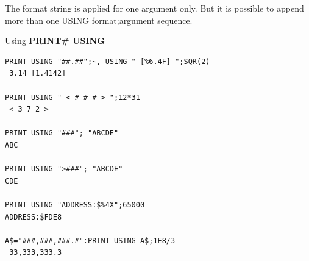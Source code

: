 \begin{description}[leftmargin=2cm,style=nextline]
\item [Remarks:] The format string is applied for one argument only.
                 But it is possible to append more than one
                 USING format;argument sequence.


\newpage
\item [Example:] Using {\bf PRINT\# USING}

\begin{tcolorbox}[colback=black,coltext=white]
\verbatimfont{\codefont}
\begin{verbatim}
PRINT USING "##.##";~, USING " [%6.4F] ";SQR(2)
 3.14 [1.4142]

PRINT USING " < # # # > ";12*31
 < 3 7 2 >

PRINT USING "###"; "ABCDE"
ABC

PRINT USING ">###"; "ABCDE"
CDE

PRINT USING "ADDRESS:$%4X";65000
ADDRESS:$FDE8

A$="###,###,###.#":PRINT USING A$;1E8/3
 33,333,333.3
\end{verbatim}
\end{tcolorbox}
\end{description}


